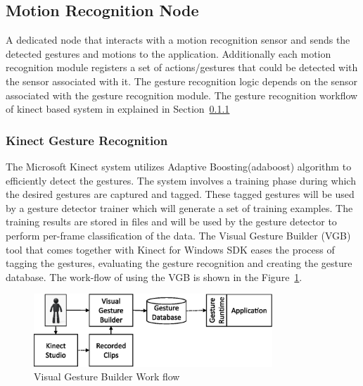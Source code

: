 \subsection{Motion Recognition Node} A dedicated node that interacts with a motion recognition sensor and sends the detected gestures and motions to the application. Additionally each motion recognition module registers a set of actions/gestures that could be detected with the sensor associated with it. The gesture recognition logic depends on the sensor associated with the gesture recognition module. The gesture recognition workflow of kinect based system in explained in Section~\ref{sssec:kinect_gestures}
\subsubsection{Kinect Gesture Recognition}
\label{sssec:kinect_gestures}
	The Microsoft Kinect system utilizes Adaptive Boosting(adaboost) algorithm \cite{freund1997decision} to efficiently detect the gestures. The system involves a training phase during which the desired gestures are captured and tagged. These tagged gestures will be used by a gesture detector trainer which will generate a set of training examples. The training results are stored in files and will be used by the gesture detector to perform per-frame classification of the data. The Visual Gesture Builder (VGB) tool that comes together with Kinect for Windows SDK eases the process of tagging the gestures, evaluating the gesture recognition and creating the gesture database. The work-flow of using the VGB is shown in the Figure~\ref{fig:vgb_workflow}.
\begin{figure}[H]
\centering
\includegraphics[width=0.8\textwidth]{assets/vgb_flow.eps}
\caption[Visual Gesture Builder Work flow]{Visual Gesture Builder Work flow \cite{KinectSDK2014}}
\label{fig:vgb_workflow}
\end{figure}
